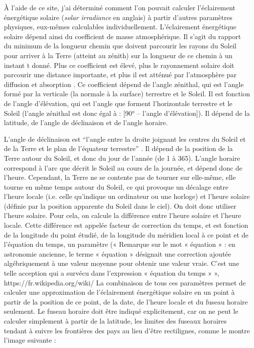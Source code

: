 \documentclass[12pt]{article}
\begin{document}
À l'aide de ce site, j'ai déterminé comment l'on pouvait calculer l'éclairement énergétique solaire (\textit{solar irradiance} en anglais) à partir d'autres paramètres physiques, eux-mêmes calculables individuellement.
L'éclairement énergétique solaire dépend ainsi du coefficient de masse atmosphérique. Il s'agit du rapport du minimum de la longueur chemin que doivent parcourir les rayons du Soleil pour arriver à la Terre (atteint au zénith) sur la longueur de ce chemin à un instant t donné. Plus ce coefficient est élevé, plus le rayonnement solaire doit parcourir une distance importante, et plus il est atténué par l'atmosphère par diffusion et absorption \cite{air_mass_wiki}.
Ce coefficient dépend de l'angle zénithal, qui est l'angle formé par la verticale (la normale à la surface) terrestre et le Soleil. Il est fonction de l'angle d'élévation, qui est l'angle que forment l'horizontale terrestre et le Soleil (l'angle zénithal est donc égal à : [90° – l'angle d'élévation]). Il dépend de la latitude, de l'angle de déclinaison et de l'angle horaire.
      
L'angle de déclinaison est ``l'angle entre la droite joignant les centres du Soleil et de la Terre et le plan de l'équateur terrestre'' \cite{mouvement_terre}. Il dépend de la position de la Terre autour du Soleil, et donc du jour de l'année (de 1 à 365).
L'angle horaire correspond à l'arc que décrit le Soleil au cours de la journée, et dépend donc de l'heure. Cependant, la Terre ne se contente pas de tourner sur elle-même, elle tourne en même temps autour du Soleil, ce qui provoque un décalage entre l'heure locale (i.e. celle qu'indique un ordinateur ou une horloge) et l'heure solaire (définie par la position apparente du Soleil dans le ciel). On doit donc utiliser l'heure solaire.
Pour cela, on calcule la différence entre l'heure solaire et l'heure locale. Cette différence est appelée facteur de correction du temps, et est fonction de la longitude du point étudié, de la longitude du méridien local à ce point et de l'équation du temps, un paramètre (« Remarque sur le mot « équation » : en astronomie ancienne, le terme « équation » désignait une correction ajoutée algébriquement à une valeur moyenne pour obtenir une valeur vraie. C'est une telle acception qui a survécu dans l'expression « équation du temps » », https://fr.wikipedia.org/wiki/%
La combinaison de tous ces paramètres permet de calculer une approximation de l'éclairement énergétique solaire en un point à partir de la position de ce point, de la date, de l'heure locale et du fuseau horaire seulement. Le fuseau horaire doit être indiqué explicitement, car on ne peut le calculer simplement à partir de la latitude, les limites des fuseaux horaires tendant à suivre les frontières des pays au lieu d'être rectilignes, comme le montre l'image suivante : 
\end{document}
